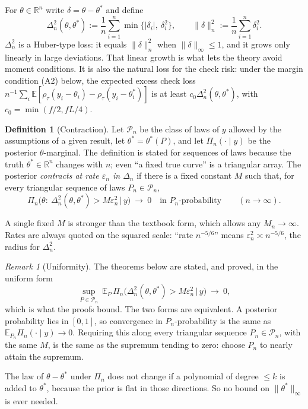 \documentclass[11pt]{article}
\newcommand{\R}{\mathbb{R}}
\newcommand{\E}{\mathbb{E}}
\newcommand{\norm}[1]{\lVert #1\rVert}
\newcommand{\Pn}{\mathcal{P}_n}
\newcommand{\Post}{\Pi_n}
\theoremstyle{plain}
\theoremstyle{definition}
\newtheorem{definition}{Definition}
\theoremstyle{remark}
\newtheorem{remark}{Remark}
\begin{document}
For $\theta\in\R^n$ write $\delta = \theta-\theta^*$ and define
\[
\Delta_n^2(\theta,\theta^*) := \frac1n\sum_{i=1}^n \min\{|\delta_i|,\ \delta_i^2\}, \qquad \norm{\delta}_n^2 := \frac1n\sum_{i=1}^n\delta_i^2 .
\]
$\Delta_n^2$ is a Huber-type loss: it equals $\norm{\delta}_n^2$ when $\norm{\delta}_\infty\le1$, and it grows only linearly in large deviations. That linear growth is what lets the theory avoid moment conditions. It is also the natural loss for the check risk: under the margin condition (A2) below, the expected excess check loss $n^{-1}\sum_i\E[\rho_\tau(y_i-\theta_i)-\rho_\tau(y_i-\theta^*_i)]$ is at least $c_0\Delta_n^2(\theta,\theta^*)$, with $c_0=\min(f/2, fL/4)$.

\begin{definition}[Contraction]
Let $\Pn$ be the class of laws of $y$ allowed by the assumptions of a given result, let $\theta^*=\theta^*(P)$, and let $\Post(\cdot\mid y)$ be the posterior $\theta$-marginal. The definition is stated for sequences of laws because the truth $\theta^*\in\R^n$ changes with $n$; even ``a fixed true curve'' is a triangular array. The posterior \emph{contracts at rate $\varepsilon_n$ in $\Delta_n$} if there is a fixed constant $M$ such that, for every triangular sequence of laws $P_n\in\Pn$,
\[
\Post\big(\theta:\ \Delta_n^2(\theta,\theta^*) > M\varepsilon_n^2 \,\big|\, y\big)\ \longrightarrow\ 0 \quad \text{in $P_n$-probability} \qquad (n\to\infty).
\]
\end{definition}
\noindent A single fixed $M$ is stronger than the textbook form, which allows any $M_n\to\infty$. Rates are always quoted on the squared scale: ``rate $n^{-5/6}$'' means $\varepsilon_n^2\asymp n^{-5/6}$, the radius for $\Delta_n^2$.

\begin{remark}[Uniformity]
The theorems below are stated, and proved, in the uniform form
\[
\sup_{P\in\Pn}\ \E_P\,\Post\big(\Delta_n^2(\theta,\theta^*) > M\varepsilon_n^2 \,\big|\, y\big)\ \longrightarrow\ 0 ,
\]
which is what the proofs bound. The two forms are equivalent. A posterior probability lies in $[0,1]$, so convergence in $P_n$-probability is the same as $\E_{P_n}\Post(\cdot\mid y)\to0$. Requiring this along every triangular sequence $P_n\in\Pn$, with the same $M$, is the same as the supremum tending to zero: choose $P_n$ to nearly attain the supremum.
\end{remark}

\noindent The law of $\theta-\theta^*$ under $\Post$ does not change if a polynomial of degree $\le k$ is added to $\theta^*$, because the prior is flat in those directions. So no bound on $\norm{\theta^*}_\infty$ is ever needed.
\end{document}
